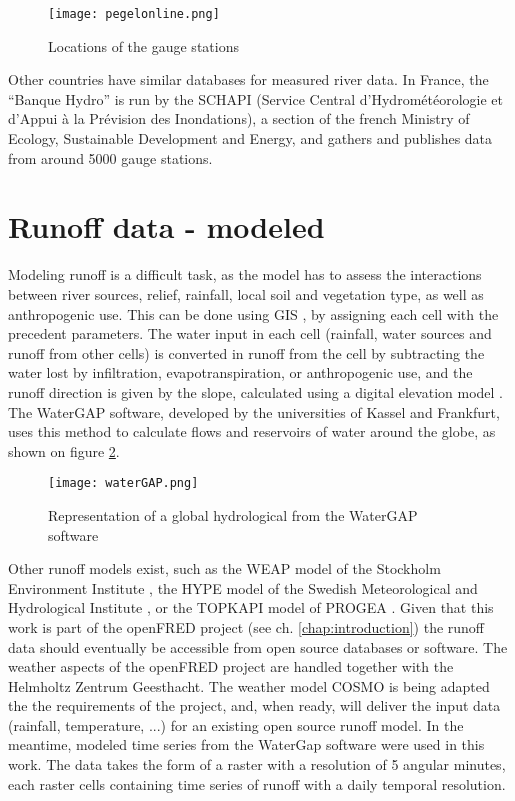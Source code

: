 \begin{figure}[H]
\centering
\texttt{[image: pegelonline.png]}
\caption[Locations of the gauge stations]{Locations of the gauge stations \cite{pegelonline}}
\label{pegelonline}
\end{figure}

Other countries have similar databases for measured river data. In France, the ``Banque Hydro'' is run by the SCHAPI (Service Central d'Hydrométéorologie et d'Appui à la Prévision des Inondations), a section of the french Ministry of Ecology, Sustainable Development and Energy, and gathers and publishes data from around 5000 gauge stations.

\section{Runoff data - modeled}

\label{sec:mod_runoff}
Modeling runoff is a difficult task, as the model has to assess the interactions between river sources, relief, rainfall, local soil and vegetation type, as well as anthropogenic use. This can be done using GIS \cite{bayazit}, by assigning each cell with the precedent parameters. The water input in each cell (rainfall, water sources and runoff from other cells) is converted in runoff from the cell by subtracting the water lost by infiltration, evapotranspiration, or anthropogenic use, and the runoff direction is given by the slope, calculated using a digital elevation model \cite{heywood}. \newline
The WaterGAP software, developed by the universities of Kassel and Frankfurt, uses this method to calculate flows and reservoirs of water around the globe, as shown on figure \ref{waterGAP}.
\begin{figure}[H]
\centering
\texttt{[image: waterGAP.png]}
\caption[Representation of a global hydrological from the WaterGAP software]{Representation of a global hydrological from the WaterGAP software \cite{doll}}
\label{waterGAP}
\end{figure}
Other runoff models exist, such as the WEAP model of the Stockholm Environment Institute \cite{weap}, the HYPE model of the Swedish Meteorological and Hydrological Institute \cite{hype}, or the TOPKAPI model of PROGEA \cite{topkapi}. \newline
Given that this work is part of the openFRED project (see ch. \ref{chap:introduction}) the runoff data should eventually be accessible from open source databases or software. The weather aspects of the openFRED project are handled together with the Helmholtz Zentrum Geesthacht. The weather model COSMO is being adapted the the requirements of the project, and, when ready, will deliver the input data (rainfall, temperature, ...) for an existing open source runoff model. \newline
In the meantime, modeled time series from the WaterGap software were used in this work. The data takes the form of a raster with a resolution of 5 angular minutes, each raster cells containing time series of runoff with a daily temporal resolution.
